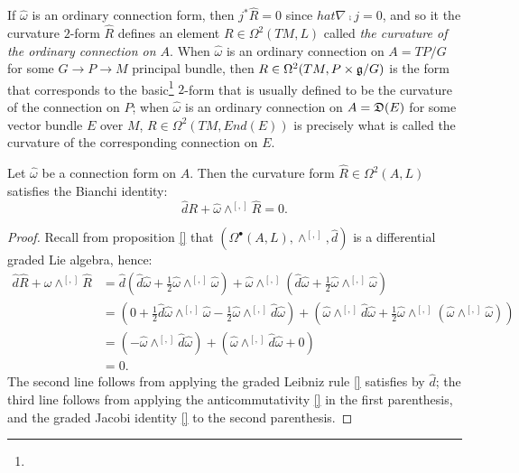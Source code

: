 If $\hat \omega$ is an ordinary connection form, then $j^* \hat R = 0$ since $hat \nabla \comp j = 0$, and so it the curvature $2$-form $\hat R$ defines an element $R \in \Omega^2(TM, L)$ called \emph{the curvature of the ordinary connection on $A$}. When $\hat \omega$ is an ordinary connection on $A = TP/G$ for some $G \to P \to M$ principal bundle, then $R \in \Omega^2(TM, P \times \mathfrak{g}/G)$ is the form that corresponds to the basic\footnote{} $2$-form that is usually defined to be the curvature of the connection on $P$; when $\hat \omega$ is an ordinary connection on $A = \mathfrak{D}(E)$ for some vector bundle $E$ over $M$, $R \in \Omega^2(TM, End(E))$ is precisely what is called the curvature of the corresponding connection on $E$.

\begin{proposition}
Let $\hat \omega$ be a connection form on $A$. Then the curvature form $\hat R \in \Omega^2(A, L)$ satisfies the Bianchi identity:
\begin{equation}
    \hat d R + \hat \omega \wedge^{[,]} \hat R = 0.
\end{equation}
\end{proposition}
\begin{proof}
Recall from proposition \ref{} that $(\Omega^\bullet(A, L), \wedge^{[,]}, \hat d)$ is a differential graded Lie algebra, hence:
\begin{align*}
    \hat d \hat  R + \hat \omega \wedge^{[,]} \hat R 
        &= \hat d(\hat d \hat \omega + \frac{1}{2}\hat \omega \wedge^{[,]} \hat \omega) + \hat \omega \wedge^{[,]} (\hat d \hat \omega + \frac{1}{2} \hat \omega \wedge^{[,]} \hat \omega) \\
        &= (0 + \frac{1}{2} \hat d \hat \omega \wedge^{[,]} \hat \omega - \frac{1}{2} \hat \omega \wedge^{[,]} \hat d \hat \omega) + (\hat \omega \wedge^{[,]} \hat d \hat \omega + \frac{1}{2} \hat \omega \wedge^{[,]} (\hat \omega \wedge^{[,]} \hat \omega)) \\
        &= (- \hat \omega \wedge^{[,]} \hat d \hat \omega) + (\hat \omega \wedge^{[,]} \hat d \hat \omega + 0) \\
        &= 0.
\end{align*}
The second line follows from applying the graded Leibniz rule \eqref{} satisfies by $\hat d$; the third line follows from applying the anticommutativity \eqref{} in the first parenthesis, and the graded Jacobi identity \ref{} to the second parenthesis.
\end{proof}

